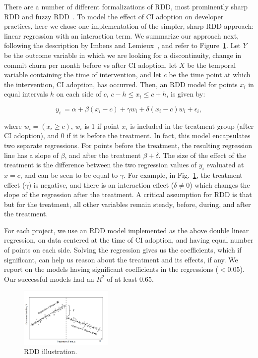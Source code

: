 There are a number of different formalizations of RDD, most prominently 
sharp RDD and fuzzy RDD~\cite{imbens2008regression}.
To model the effect of CI adoption on developer practices, here we chose one implementation
of the simpler, sharp RDD approach: linear regression with an interaction term.
We summarize our approach next, following the description by Imbens and 
Lemieux~\cite{imbens2008regression}, and refer to Figure~\ref{RDDIllustration}.
Let $Y$ be the outcome variable in which we are looking for a discontinuity, 
\eg change in commit churn per month before vs after CI adoption, let $X$ be the temporal variable containing the 
time of intervention, and let $c$ be the time point at which the intervention, \eg CI adoption, has occurred.
Then, an RDD model for points $x_i$ in equal intervals $h$ on each side of 
$c$, $c-h \le x_i \le c+h$, is given by:

\[y_i \ = \alpha + \beta(x_i-c) + \gamma w_i + \delta(x_i-c)w_i + \epsilon_i,\]

\noindent where $w_i = (x_i \geq c)$, \ie $w_i$ is 1 if point $x_i$ is included in 
the treatment group (\eg after CI adoption), and 0 if it is before the treatment.
In fact, this model encapsulates two separate regressions.
For points before the treatment, the resulting regression line has a slope of 
$\beta$, and after the treatment $\beta + \delta$.
The size of the effect of the treatment is the difference between the two 
regression values of $y_i$ evaluated at $x=c$, and can be seen to be equal 
to $\gamma$.
For example, in Fig.~\ref{RDDIllustration}, the treatment effect ($\gamma$) is negative, and there is an interaction effect ($\delta \neq 0$) which changes the slope of the regression after the treatment.
A critical assumption for RDD is that but for the treatment, all other variables remain steady, before, during, and after the treatment.

For each project, we use an RDD model implemented as the above 
double linear regression, on data centered at the time of CI adoption, and 
having equal number of points on each side.
Solving the regression gives us the coefficients, which if significant, can help us reason about the treatment and its effects, if any.
We report on the models having significant coefficients in the regressions ($<0.05$). Our successful models had an $R^2$ of at least $0.65$. 



\begin{figure}[t]
	\centering
	\includegraphics[width=0.4\textwidth, clip=true, trim=0 15 15 50]{RDD_plot.png}
	\caption{RDD illustration.}\vspace{-0.5cm}
	\label{RDDIllustration}
\end{figure}

